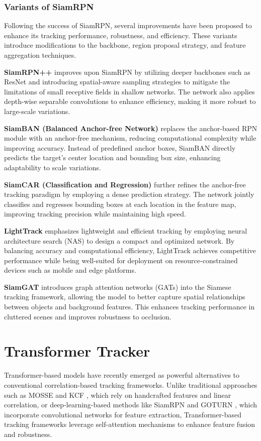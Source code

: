 \subsubsection{Variants of SiamRPN}

Following the success of SiamRPN, several improvements have been proposed to enhance its tracking performance, robustness, and efficiency. These variants introduce modifications to the backbone, region proposal strategy, and feature aggregation techniques.

\textbf{SiamRPN++} \cite{li2019siamrpn++} improves upon SiamRPN by utilizing deeper backbones such as ResNet and introducing spatial-aware sampling strategies to mitigate the limitations of small receptive fields in shallow networks. The network also applies depth-wise separable convolutions to enhance efficiency, making it more robust to large-scale variations.

\textbf{SiamBAN (Balanced Anchor-free Network)} \cite{chen2020siamban} replaces the anchor-based RPN module with an anchor-free mechanism, reducing computational complexity while improving accuracy. Instead of predefined anchor boxes, SiamBAN directly predicts the target’s center location and bounding box size, enhancing adaptability to scale variations.

\textbf{SiamCAR (Classification and Regression)} \cite{guo2020siamcar} further refines the anchor-free tracking paradigm by employing a dense prediction strategy. The network jointly classifies and regresses bounding boxes at each location in the feature map, improving tracking precision while maintaining high speed.

\textbf{LightTrack} \cite{yan2021lighttrack} emphasizes lightweight and efficient tracking by employing neural architecture search (NAS) to design a compact and optimized network. By balancing accuracy and computational efficiency, LightTrack achieves competitive performance while being well-suited for deployment on resource-constrained devices such as mobile and edge platforms.

\textbf{SiamGAT} \cite{lu2023siamese} introduces graph attention networks (GATs) into the Siamese tracking framework, allowing the model to better capture spatial relationships between objects and background features. This enhances tracking performance in cluttered scenes and improves robustness to occlusion.

\section{Transformer Tracker}
Transformer-based models have recently emerged as powerful alternatives to conventional correlation-based tracking frameworks. Unlike traditional approaches such as MOSSE \cite{bolme2010visual} and KCF \cite{henriques2014high}, which rely on handcrafted features and linear correlation, or deep-learning-based methods like SiamRPN \cite{li2018high} and GOTURN \cite{held2016learning}, which incorporate convolutional networks for feature extraction, Transformer-based tracking frameworks leverage self-attention mechanisms to enhance feature fusion and robustness.


